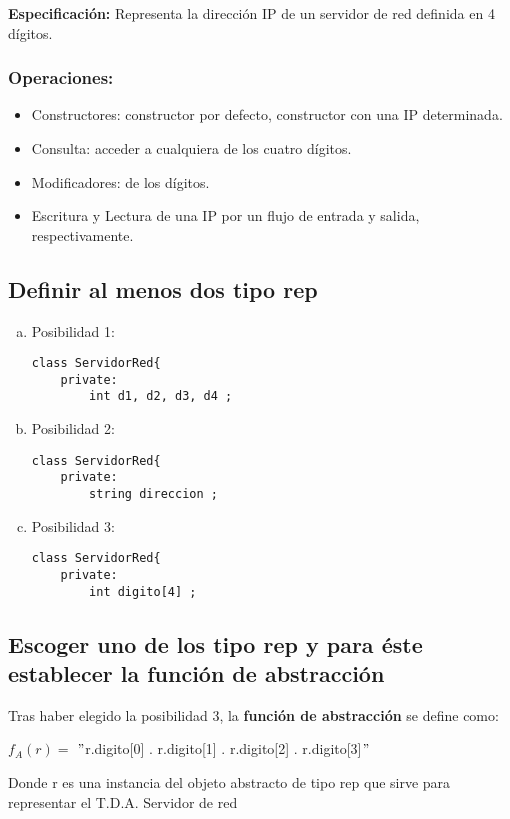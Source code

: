 \textbf{Especificación:} 
Representa la dirección IP de un servidor de red definida en 4 dígitos.

\subsubsection{Operaciones:}
\begin{itemize}
	\item Constructores: constructor por defecto, constructor con una IP determinada.
	\item Consulta: acceder a cualquiera de los cuatro dígitos.
	\item Modificadores: de los dígitos.
	\item Escritura y Lectura de una IP por un flujo de entrada y salida, respectivamente.
\end{itemize}

\subsection{Definir al menos dos tipo rep}
\begin{enumerate}[a)]
\item Posibilidad 1:
\begin{lstlisting}[style=cmas]
class ServidorRed{
	private:
		int d1, d2, d3, d4 ;		
\end{lstlisting}
\setlength{\parskip}{-4mm}
\item Posibilidad 2:
\begin{lstlisting}[style=cmas]
class ServidorRed{
	private:
		string direccion ;		
\end{lstlisting}
\setlength{\parskip}{-4mm}
\item Posibilidad 3:
\begin{lstlisting}[style=cmas]
class ServidorRed{
	private:
		int digito[4] ;		
\end{lstlisting}
\end{enumerate}

\subsection{Escoger uno de los tipo rep y para éste establecer la función de abstracción}
Tras haber elegido la posibilidad 3, la \textbf{función de abstracción} se define como:\\
\begin{center}
	$ f_{A}(r) = $ $ " $r.digito[0] . r.digito[1] . r.digito[2] . r.digito[3]$ " $
\end{center}
Donde r es una instancia del objeto abstracto de tipo rep que sirve para representar el T.D.A. Servidor de red

